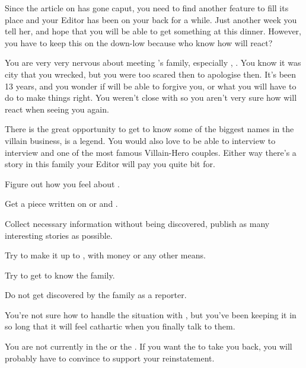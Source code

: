 \documentclass[char]{LRSguildcamp1}
\begin{document}
Since the article on \cYoungest{} has gone caput, you need to find another feature to fill its place and your Editor has been on your back for a while. Just another week you tell her, and hope that you will be able to get something at this dinner. However, you have to keep this on the down-low because who know how \cYoungest{\they} will react? 

You are very very nervous about meeting \cYoungest{}'s family, especially , \cOS{}. You know it was \cOS{\their} city that you wrecked, but you were too scared then to apologise then. It's been 13 years, and you wonder if \cOS{\they} will be able to forgive you, or what you will have to do to make things right. You weren't close with \cOS{} so you aren't very sure how \cOS{\they} will react when seeing you again. 

There is the great opportunity to get to know some of the biggest names in the villain business, \cGrandma{\MYsupername} is a legend. You would also love to be able to interview to interview \cOldest{\MYsupername} and \cOS{\MYsupername} one of the most famous Villain-Hero couples. Either way there's a story in this family your Editor will pay you quite bit for. 


\begin{itemz}[Goals]
	\item Figure out how you feel about \cYoungest{}. 
	\item Get a piece written on \cGrandma{} or \cOldest{} and \cOS{}. 
	\item Collect necessary information without being discovered, publish as many interesting stories as possible.
	\item Try to make it up to \cOS{}, with money or any other means.
	\item Try to get to know the family. 
	\item Do not get discovered by the family as a reporter. 
\end{itemz}

\begin{itemz}[Notes]
	\item You're not sure how to handle the situation with \cOS{}, but you've been keeping it in so long that it will feel cathartic when you finally talk to them. 
	\item You are not currently in the \cHeroLeague{\intro} or the \cVillainCompact{\intro}.  If you want the \cHeroLeague{} to take you back, you will probably have to convince \cYoungest{} to support your reinstatement. 

\end{itemz}
\end{document}
